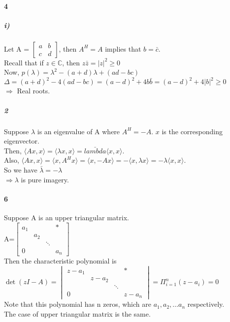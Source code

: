 \documentclass[10pt,letter]{article}
\begin{document}
\paragraph{4}
\subparagraph{i)}
Let A = $\begin{bmatrix}
a&b\\c&d
\end{bmatrix}
$, then $A^H=A$ implies that $b=\bar{c}$. \\
Recall that if $z\in \mathbb{C}$, then $z\bar{z}=|z|^2\geq 0$\\
Now, $p(\lambda)=\lambda^2-(a+d)\lambda+(ad-bc)$\\
$\Delta=(a+d)^2-4(ad-bc)=(a-d)^2+4b\bar{b}=(a-d)^2+4|b|^2\geq 0$\\
$\Rightarrow$ Real roots.
\subparagraph{2}
Suppose $\lambda$ is an eigenvalue of A where $A^H=-A$. $x$ is the corresponding eigenvector. \\
Then, $\langle Ax, x\rangle=\langle \lambda x, x\rangle=\bar{lambda}\langle x, x\rangle$. \\
Also, $\langle Ax, x\rangle=\langle x, A^Hx\rangle=\langle x, -Ax\rangle=-\langle x,\lambda x\rangle=-\lambda \langle x, x\rangle$. \\
So we have $\bar{\lambda}=-\lambda$\\
$\Rightarrow \lambda$ is pure imagery.
\paragraph{6}
Suppose A is an upper triangular matrix.\\
A=$\begin{bmatrix}
a_1& & &*\\
 &a_2& & \\
 & &\ddots& \\
 0& & & a_n
\end{bmatrix}$\\
Then the characteristic polynomial is \\
$\det (zI-A)=\begin{vmatrix}
z-a_1& & &*\\
&z-a_2& & \\
& &\ddots& \\
0& & & z-a_n
\end{vmatrix}=\Pi_{i=1}^n(z-a_i)=0$\\
Note that this polynomial has n zeros, which are $a_1, a_2,\dots a_n$ respectively.\\
The case of upper triangular matrix is the same.
\end{document}
